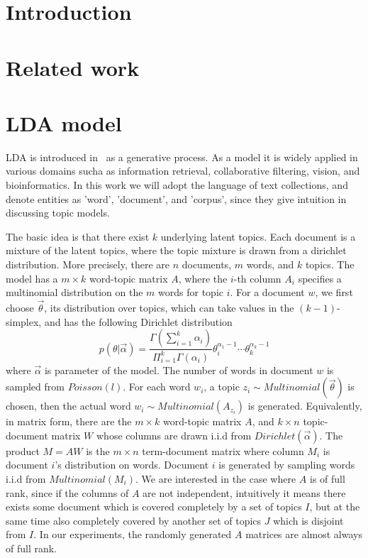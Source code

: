 \documentclass{article}
\begin{document}
\section{Introduction} \label{sec:intro}


\section{Related work}

\section{LDA model} \label{sec:ldamodel}
LDA is introduced in~\cite{Blei2003a} as a generative process. As a model it is widely applied in various domains sucha as information retrieval, collaborative filtering, vision, and bioinformatics. In this work we will adopt the language of text collections, and denote entities as 'word', 'document', and 'corpus', since they give intuition in discussing topic models.  

The basic idea is that there exist $k$ underlying latent topics. Each document is a mixture of the latent topics, where the topic mixture is drawn from a dirichlet distribution. More precisely, there are $n$ documents, $m$ words, and $k$ topics. The model has a $m\times k$ word-topic matrix $A$, where the $i$-th column $A_i$ specifies a multinomial distribution on the $m$ words for topic $i$. For a document $w$, we first choose $\vec{\theta}$, its distribution over topics, which can take values in the $(k-1)$-simplex, and has the following Dirichlet distribution
\[
p(\theta|\vec{\alpha})=\frac{\Gamma(\sum_{i=1}^k\alpha_i)}{\Pi_{i=1}^k\Gamma(\alpha_i)}\theta_i^{\alpha_1-1}\cdots\theta_k^{\alpha_k-1}
\] 
where $\vec{\alpha}$ is parameter of the model. The number of words in document $w$ is sampled from $Poisson(l)$. For each word $w_i$, a topic $z_i\sim Multinomial(\vec{\theta})$ is chosen, then the actual word $w_i\sim Multinomial(A_{z_i})$ is generated. Equivalently, in matrix form, there are the $m\times k$ word-topic matrix $A$, and $k\times n$ topic-document matrix $W$ whose columns are drawn i.i.d from $Dirichlet(\vec{\alpha})$. The product $M=AW$ is the $m\times n$ term-document matrix where column $M_i$ is document $i$'s distribution on words. Document $i$ is generated by sampling words i.i.d from $Multinomial(M_i)$. We are interested in the case where $A$ is of full rank, since if the columns of $A$ are not independent, intuitively it means there exists some document which is covered completely by a set of topics $I$, but at the same time also completely covered by another set of topics $J$ which is disjoint from $I$. In our experiments, the randomly generated $A$ matrices are almost always of full rank. 
\end{document}
